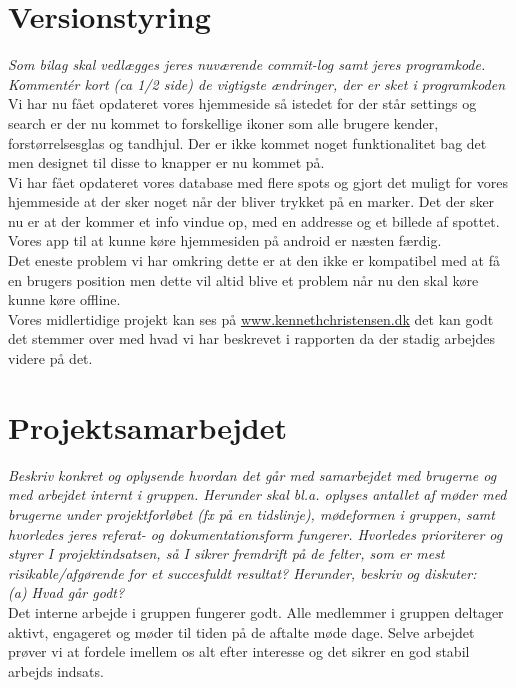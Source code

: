\documentclass[12pt]{article}
\begin{document}
\pagebreak
\section{Versionstyring}
\textit{Som bilag skal vedlægges jeres nuværende commit-log samt jeres
programkode. Kommentér kort (ca 1/2 side) de vigtigste ændringer, der er sket i programkoden}\\

Vi har nu fået opdateret vores hjemmeside så istedet for der står settings og search er der nu kommet to forskellige ikoner som alle brugere kender, forstørrelsesglas og tandhjul. Der er ikke kommet noget funktionalitet bag det men designet til disse to knapper er nu kommet på. \\
Vi har fået opdateret vores database med flere spots og gjort det muligt for vores hjemmeside at der sker noget når der bliver trykket på en marker. Det der sker nu er at der kommer et info vindue op, med en addresse og et billede af spottet.\\
Vores app til at kunne køre hjemmesiden på android er næsten færdig.\\
Det eneste problem vi har omkring dette er at den ikke er kompatibel med at få en brugers position men dette vil altid blive et problem når nu den skal køre kunne køre offline.\\
Vores midlertidige projekt kan ses på \url{www.kennethchristensen.dk} det kan godt det stemmer over med hvad vi har beskrevet i rapporten da der stadig arbejdes videre på det.\\

\pagebreak
\section{Projektsamarbejdet}
\textit{Beskriv konkret og oplysende hvordan det går med samarbejdet med brugerne
og med arbejdet internt i gruppen. Herunder skal bl.a. oplyses antallet af møder med brugerne under
projektforløbet (fx på en tidslinje), mødeformen i gruppen, samt hvorledes jeres referat- og
dokumentationsform fungerer. Hvorledes prioriterer og styrer I projektindsatsen, så I sikrer
fremdrift på de felter, som er mest risikable/afgørende for et succesfuldt resultat? Herunder, beskriv
og diskuter:}\\

\textit{(a) Hvad går godt?}\\
Det interne arbejde i gruppen fungerer godt. Alle medlemmer i gruppen deltager aktivt, engageret og møder til tiden på de aftalte møde dage. Selve arbejdet prøver vi at fordele imellem os alt efter interesse og det sikrer en god stabil arbejds indsats.\\
\end{document}
